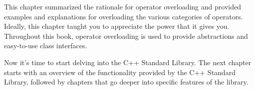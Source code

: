 This chapter summarized the rationale for operator overloading and provided examples and explanations for overloading the various categories of operators. Ideally, this chapter taught you to appreciate the power that it gives you. Throughout this book, operator overloading is used to provide abstractions and easy-to-use class interfaces.

Now it’s time to start delving into the C++ Standard Library. The next chapter starts with an overview of the functionality provided by the C++ Standard Library, followed by chapters that go deeper into specific features of the library.


